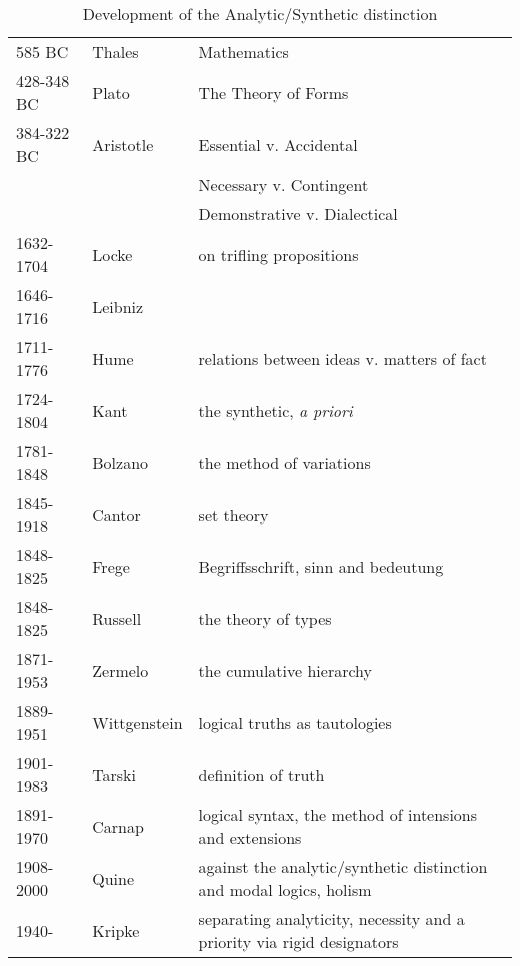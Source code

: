 \begin{table}[h]
\begin{center}
\begin{tabular}{|l l p{4.5cm}|}
\hline
585 BC & Thales & Mathematics\\
428-348 BC & Plato & The Theory of Forms\\
384-322 BC & Aristotle & Essential v. Accidental \\
& & Necessary v. Contingent\\
& & Demonstrative v. Dialectical\\
1632-1704 & Locke & on trifling propositions\\
1646-1716 & Leibniz & \\
1711-1776 & Hume & relations between ideas v. matters of fact \\
1724-1804 & Kant & the synthetic, \emph{a priori} \\
1781-1848 & Bolzano & the method of variations \\
1845-1918 & Cantor & set theory \\
1848-1825 & Frege & Begriffsschrift, sinn and bedeutung \\
1848-1825 & Russell & the theory of types \\
1871-1953 & Zermelo & the cumulative hierarchy \\
1889-1951 & Wittgenstein & logical truths as tautologies \\
1901-1983 & Tarski & definition of truth \\
1891-1970 & Carnap & logical syntax, the method of intensions and extensions\\
1908-2000 & Quine & against the analytic/synthetic distinction and modal logics, holism\\
1940- & Kripke & separating analyticity, necessity and a priority via rigid designators\\
\hline
\end{tabular}
\caption{Development of the Analytic/Synthetic distinction}
\label{tab:AnalyticSynthetic}
\end{center}
\end{table}

